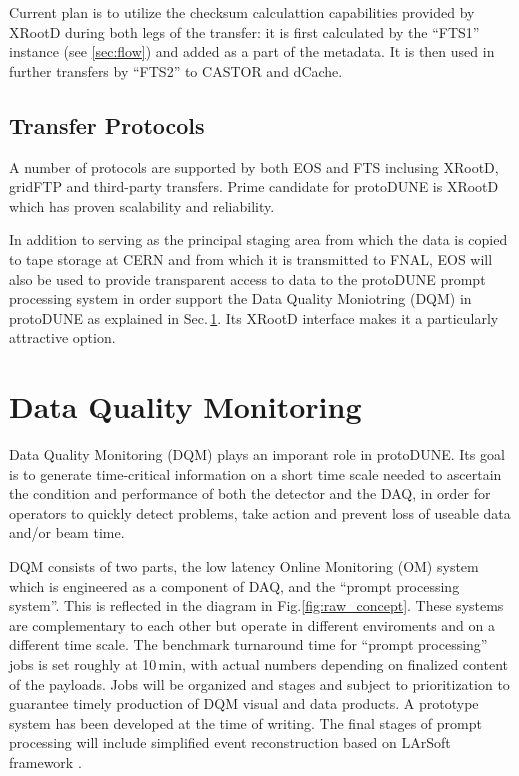 \documentclass[a4paper]{jpconf}
\newcommand{\pd}{protoDUNE\xspace}
\begin{document}
Current plan is to utilize the checksum calculattion capabilities provided by XRootD
during both legs of the transfer: it is first calculated by the ``FTS1'' instance
(see \ref{sec:flow}) and added as a part of the metadata. It is then used in further transfers
by ``FTS2'' to CASTOR and dCache.

\subsection{Transfer Protocols}
A number of protocols are supported by both EOS and FTS inclusing XRootD, gridFTP
and third-party transfers. Prime candidate for \pd is XRootD which has proven scalability
and reliability.

In addition to serving as the principal staging area from which the data is copied to
tape storage at CERN and from which it is transmitted to FNAL, 
EOS will also be used to provide transparent access to data to the
\pd prompt processing system 
in order support the Data Quality Moniotring (DQM) in \pd as explained in Sec.\,\ref{sec:dqm}.
Its XRootD interface makes it a particularly attractive option.

\section{Data Quality Monitoring}
\label{sec:dqm}
Data Quality Monitoring (DQM) plays an imporant role in \pd.
Its goal is to generate time-critical information on a short time
scale needed to ascertain the condition
and performance of both the detector and the DAQ,
in order for operators to quickly detect problems, take action and prevent loss
of useable data and/or beam time.

DQM consists of two parts,  the low latency Online Monitoring (OM)
system which is engineered as a component of DAQ, and
the ``prompt processing system''. This is reflected in the diagram
in Fig.\ref{fig:raw_concept}.
These systems are complementary to each other but operate
in different enviroments and on a different time scale.
The benchmark turnaround time for ``prompt processing'' jobs 
is set roughly at 10\,min, with actual numbers depending on
finalized content of the payloads. Jobs will be organized and stages
and subject to prioritization to guarantee timely production of DQM
visual and data products. A prototype system has been developed at
the time of writing. The final stages of prompt processing will
include simplified event reconstruction based on LArSoft framework
\cite{larsoft}.
\end{document}
